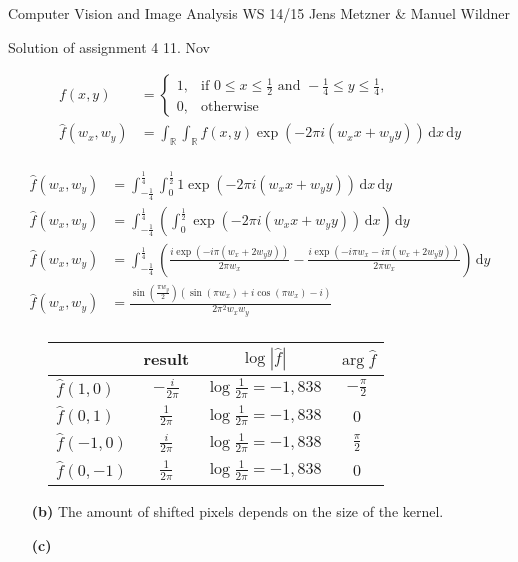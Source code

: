 \documentclass[10pt,a4paper]{scrartcl}
\newcommand{\R}{\mathbb{R}}
\newcommand{\der}{\,\mathrm{d}}
\begin{document}
\uebkopfzeile
  {Computer Vision and Image Analysis} %
  {WS 14/15}  %
  {}    %
  {Jens Metzner \& Manuel Wildner}    %

\uebtitel
{Solution of assignment 4} %
{11. Nov} %



\begin{align*}
f(x,y) &= \left\{\begin{array}{cl} 1, & \mbox{if }0 \leq x \leq \frac{1}{2} \mbox{ and } -\frac{1}{4} \leq y \leq \frac{1}{4},\\ 0, & \mbox{otherwise} \end{array}\right.\\
%
\hat f(w_x,w_y) &= \int_\R \int_\R f(x,y) \exp{\left(-2\pi i(w_xx+w_yy)\right)}\der x \der y\\
\end{align*}

\begin{align*}
\hat f(w_x,w_y) &= \int_{-\frac{1}{4}}^\frac{1}{4} \int_0^\frac{1}{2} 1 \exp{\left(-2\pi i(w_xx+w_yy)\right)}\der x \der y\\
%
\hat f(w_x,w_y) &= \int_{-\frac{1}{4}}^\frac{1}{4} \left(\int_0^\frac{1}{2} \exp{\left(-2\pi i(w_xx+w_yy)\right)}\der x \right)\der y\\
%
\hat f(w_x,w_y) &= \int_{-\frac{1}{4}}^\frac{1}{4} \left(\frac{i\exp{\left(-i\pi (w_x+2w_yy)\right)}}{2\pi w_x} - \frac{i\exp{\left(-i\pi w_x-i\pi(w_x+2w_yy)\right)}}{2\pi w_x}\right)\der y\\
%
\hat f(w_x,w_y) &= \frac{\sin{\left(\frac{\pi w_y}{2}\right)} \left(\sin{(\pi w_x)} + i \cos{(\pi w_x)} - i\right)}{2 \pi^2 w_x w_y}\\
\end{align*}
\begin{figure}[h]
\center
\renewcommand\arraystretch{1.5}%
\begin{tabular}{l|ccc}
 & result & $\log|\hat f|$ & $\arg{\hat f}$\\\hline
$\hat f(1,0)$ & $-\frac{i}{2\pi}$ & $\log\frac{1}{2\pi} = -1,838$ & $-\frac{\pi}{2}$ \\
$\hat f(0,1)$ & $\frac{1}{2\pi}$ & $\log\frac{1}{2\pi} = -1,838$ & 0 \\
$\hat f(-1,0)$ & $\frac{i}{2\pi}$ & $\log\frac{1}{2\pi} = -1,838$ & $\frac{\pi}{2}$ \\
$\hat f(0,-1)$ & $\frac{1}{2\pi}$ & $\log\frac{1}{2\pi} = -1,838$ & 0 \\
\end{tabular}
\end{figure}


\begin{itemize}
\item[\textbf{(b)}] The amount of shifted pixels depends on the size of the kernel.
\item[\textbf{(c)}]
\end{itemize}


\end{document}
